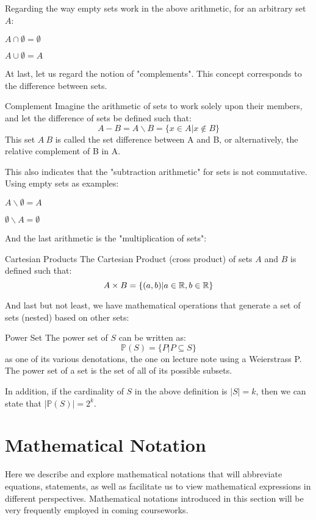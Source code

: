 Regarding the way empty sets work in the above arithmetic, for an arbitrary set $A$:
\begin{bindenum}
    \item $A \cap \emptyset = \emptyset$
    \item $A \cup \emptyset = A$
\end{bindenum}
At last, let us regard the notion of "complements". This concept corresponds to the difference between sets.
\begin{ln-define}{Complement}{}
    Imagine the arithmetic of sets to work solely upon their members, and let the difference of sets be defined such that:
    \[A - B = A \backslash B = \{x \in A | x \notin B\}\]
    This set $A \ B$ is called the set difference between A and B, or alternatively, the relative complement of B in A.
\end{ln-define}
This also indicates that the "subtraction arithmetic" for sets is not commutative. Using empty sets as examples:
\begin{bindenum}
    \item $A \backslash \emptyset = A$
    \item $\emptyset \backslash A = \emptyset$
\end{bindenum}
And the last arithmetic is the "multiplication of sets":
\begin{ln-define}{Cartesian Products}{}
    The Cartesian Product (cross product) of sets $A$ and $B$ is defined such that:
    \[A \times B = \{(a, b) | a \in \mathbb{R}, b \in \mathbb{R}\}\]
\end{ln-define}
And last but not least, we have mathematical operations that generate a set of sets (nested) based on other sets:
\begin{ln-define}{Power Set}{}
    The power set of $S$ can be written as:
    \[\mathbb{P} (S) = \{P | P \subseteq S\}\]
    as one of its various denotations, the one on lecture note using a Weierstrass P. \\
    The power set of a set is the set of all of its possible subsets.
\end{ln-define}
In addition, if the cardinality of $S$ in the above definition is $|S| = k$, then we can state that $|\mathbb{P} (S)| = 2^k$.

\section{Mathematical Notation}
Here we describe and explore mathematical notations that will abbreviate equations, statements, as well as facilitate us to view mathematical expressions in different perspectives. Mathematical notations introduced in this section will be very frequently employed in coming courseworks.

